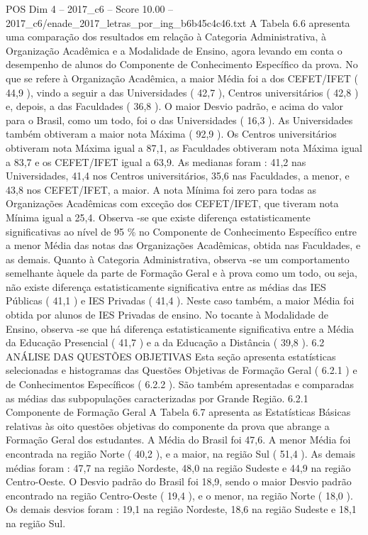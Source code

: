 \begin{textsample}{POS Dim 4 – 2017\_c6 – Score 10.00 – 2017\_c6/enade\_2017\_letras\_por\_ing\_b6b45c4c46.txt}
A Tabela 6.6 apresenta uma comparação dos resultados em relação à Categoria Administrativa, à Organização Acadêmica e a Modalidade de Ensino, agora levando em conta o desempenho de alunos do Componente de Conhecimento Específico da prova.
No que se refere à Organização Acadêmica, a maior Média foi a dos CEFET/IFET ( 44,9 ), vindo a seguir a das Universidades ( 42,7 ), Centros universitários ( 42,8 ) e, depois, a das Faculdades ( 36,8 ).
O maior Desvio padrão, e acima do valor para o Brasil, como um todo, foi o das Universidades ( 16,3 ).
As Universidades também obtiveram a maior nota Máxima ( 92,9 ).
Os Centros universitários obtiveram nota Máxima igual a 87,1, as Faculdades obtiveram nota Máxima igual a 83,7 e os CEFET/IFET igual a 63,9.
As medianas foram : 41,2 nas Universidades, 41,4 nos Centros universitários, 35,6 nas Faculdades, a menor, e 43,8 nos CEFET/IFET, a maior.
A nota Mínima foi zero para todas as Organizações Acadêmicas com exceção dos CEFET/IFET, que tiveram nota Mínima igual a 25,4.
Observa -se que existe diferença estatisticamente significativas ao nível de 95 \% no Componente de Conhecimento Específico entre a menor Média das notas das Organizações Acadêmicas, obtida nas Faculdades, e as demais.
Quanto à Categoria Administrativa, observa -se um comportamento semelhante àquele da parte de Formação Geral e à prova como um todo, ou seja, não existe diferença estatisticamente significativa entre as médias das IES Públicas ( 41,1 ) e IES Privadas ( 41,4 ).
Neste caso também, a maior Média foi obtida por alunos de IES Privadas de ensino.
No tocante à Modalidade de Ensino, observa -se que há diferença estatisticamente significativa entre a Média da Educação Presencial ( 41,7 ) e a da Educação a Distância ( 39,8 ). 6.2 ANÁLISE DAS QUESTÕES OBJETIVAS Esta seção apresenta estatísticas selecionadas e histogramas das Questões Objetivas de Formação Geral ( 6.2.1 ) e de Conhecimentos Específicos ( 6.2.2 ).
São também apresentadas e comparadas as médias das subpopulações caracterizadas por Grande Região. 6.2.1 Componente de Formação Geral A Tabela 6.7 apresenta as Estatísticas Básicas relativas às oito questões objetivas do componente da prova que abrange a Formação Geral dos estudantes.
A Média do Brasil foi 47,6.
A menor Média foi encontrada na região Norte ( 40,2 ), e a maior, na região Sul ( 51,4 ).
As demais médias foram : 47,7 na região Nordeste, 48,0 na região Sudeste e 44,9 na região Centro-Oeste.
O Desvio padrão do Brasil foi 18,9, sendo o maior Desvio padrão encontrado na região Centro-Oeste ( 19,4 ), e o menor, na região Norte ( 18,0 ).
Os demais desvios foram : 19,1 na região Nordeste, 18,6 na região Sudeste e 18,1 na região Sul.

\end{textsample}
